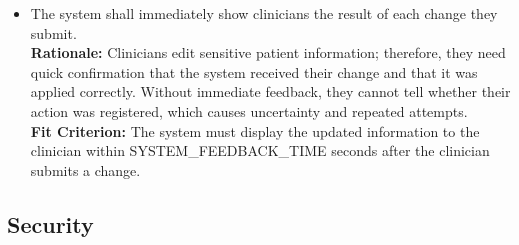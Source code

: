 \documentclass[12pt]{article}
\newcounter{nfrnum} %
\newcommand{\rthenfrnum}{NFR\thenfrnum}
\begin{document}
\begin{itemize}
\item[\textbf{\rthenfrnum}:]
\label{NFR-U4}
  The system shall immediately show clinicians the result of each change they submit.
  \\ \textbf{Rationale:} Clinicians edit sensitive patient information; therefore, they need quick confirmation that the system received their change and that it was applied correctly. Without immediate feedback, they cannot tell whether their action was registered, which causes uncertainty and repeated attempts.
  \\ \textbf{Fit Criterion:} The system must display the updated information to the clinician within SYSTEM\_FEEDBACK\_TIME seconds after the clinician submits a change.

\end{itemize}

\subsection{Security}
\end{document}
